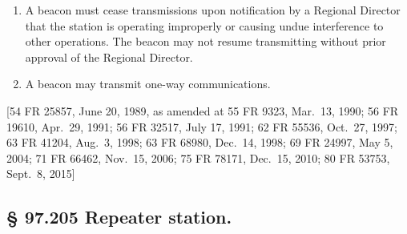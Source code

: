 \documentclass[
  letterpaper,
  DIV=11,
  numbers=noendperiod]{scrreport}
\begin{document}
\begin{enumerate}
\def\labelenumi{(\alph{enumi})}
\setcounter{enumi}{5}
\item
  A beacon must cease transmissions upon notification by a Regional
  Director that the station is operating improperly or causing undue
  interference to other operations. The beacon may not resume
  transmitting without prior approval of the Regional Director.
\item
  A beacon may transmit one-way communications.
\end{enumerate}

{[}54 FR 25857, June 20, 1989, as amended at 55 FR 9323, Mar.~13, 1990;
56 FR 19610, Apr.~29, 1991; 56 FR 32517, July 17, 1991; 62 FR 55536,
Oct.~27, 1997; 63 FR 41204, Aug.~3, 1998; 63 FR 68980, Dec.~14, 1998; 69
FR 24997, May 5, 2004; 71 FR 66462, Nov.~15, 2006; 75 FR 78171, Dec.~15,
2010; 80 FR 53753, Sept.~8, 2015{]}

\hypertarget{repeater-station.}{%
\subsection*{§ 97.205 Repeater station.}\label{repeater-station.}}
\end{document}
